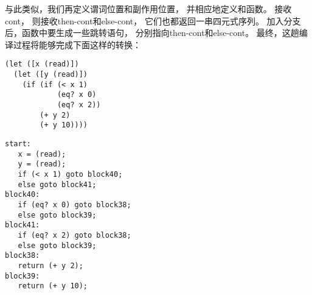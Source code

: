 与此类似，我们再定义谓词位置和副作用位置，
并相应地定义和函数。
接收cont，
则接收then-cont和else-cont，
它们也都返回一串四元式序列。
加入分支后，函数中要生成一些跳转语句，
分别指向then-cont和else-cont。
最终，这趟编译过程将能够完成下面这样的转换：

\begin{transformation}
\begin{lstlisting}
(let ([x (read)])
  (let ([y (read)])
    (if (if (< x 1)
            (eq? x 0)
            (eq? x 2))
        (+ y 2)
        (+ y 10))))
\end{lstlisting}
\compilesto
\begin{lstlisting}
start:
   x = (read);
   y = (read);
   if (< x 1) goto block40;
   else goto block41;
block40:
   if (eq? x 0) goto block38;
   else goto block39;
block41:
   if (eq? x 2) goto block38;
   else goto block39;
block38:
   return (+ y 2);
block39:
   return (+ y 10);
\end{lstlisting}
\end{transformation}

